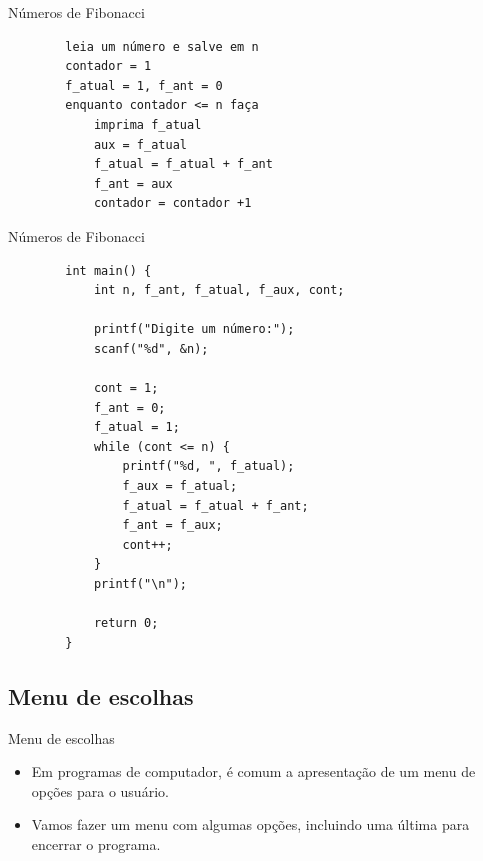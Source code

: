 \documentclass[handout]{beamer}
\begin{document}
\begin{frame}[fragile]{Números de Fibonacci}

    \begin{verbatim}
        leia um número e salve em n
        contador = 1
        f_atual = 1, f_ant = 0
        enquanto contador <= n faça
            imprima f_atual
            aux = f_atual
            f_atual = f_atual + f_ant
            f_ant = aux
            contador = contador +1
    \end{verbatim}
\end{frame}

\begin{frame}[fragile]{Números de Fibonacci}
    
    \begin{verbatim}
        int main() {
            int n, f_ant, f_atual, f_aux, cont;

            printf("Digite um número:");
            scanf("%d", &n);
    
            cont = 1;
            f_ant = 0;
            f_atual = 1;
            while (cont <= n) {
                printf("%d, ", f_atual);
                f_aux = f_atual;
                f_atual = f_atual + f_ant;
                f_ant = f_aux;
                cont++;
            }
            printf("\n");

            return 0;
        }
    \end{verbatim}
\end{frame}

\subsection{Menu de escolhas}%

\begin{frame}[fragile]{Menu de escolhas}
    \begin{itemize}
        \item Em programas de computador, é comum a apresentação de um menu de opções para o usuário.
        \item Vamos fazer um menu com algumas opções, incluindo uma última para encerrar o programa.
    \end{itemize}
\end{frame}
\end{document}
